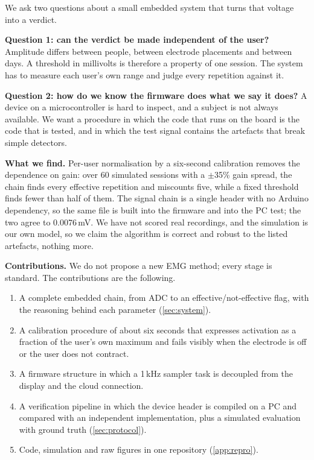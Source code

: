 \documentclass[11pt,letterpaper]{article}
\begin{document}
We ask two questions about a small embedded system that turns that voltage into a verdict.

\textbf{Question 1: can the verdict be made independent of the user?} Amplitude differs between people, between electrode placements and between days. A threshold in millivolts is therefore a property of one session. The system has to measure each user's own range and judge every repetition against it.

\textbf{Question 2: how do we know the firmware does what we say it does?} A device on a microcontroller is hard to inspect, and a subject is not always available. We want a procedure in which the code that runs on the board is the code that is tested, and in which the test signal contains the artefacts that break simple detectors.

\textbf{What we find.} Per-user normalisation by a six-second calibration removes the dependence on gain: over 60 simulated sessions with a $\pm$35\% gain spread, the chain finds every effective repetition and miscounts five, while a fixed threshold finds fewer than half of them. The signal chain is a single header with no Arduino dependency, so the same file is built into the firmware and into the PC test; the two agree to 0.0076\,mV. We have not scored real recordings, and the simulation is our own model, so we claim the algorithm is correct and robust to the listed artefacts, nothing more.

\textbf{Contributions.} We do not propose a new EMG method; every stage is standard. The contributions are the following.
\begin{enumerate}
\item A complete embedded chain, from ADC to an effective/not-effective flag, with the reasoning behind each parameter (\cref{sec:system}).
\item A calibration procedure of about six seconds that expresses activation as a fraction of the user's own maximum and fails visibly when the electrode is off or the user does not contract.
\item A firmware structure in which a 1\,kHz sampler task is decoupled from the display and the cloud connection.
\item A verification pipeline in which the device header is compiled on a PC and compared with an independent implementation, plus a simulated evaluation with ground truth (\cref{sec:protocol}).
\item Code, simulation and raw figures in one repository (\cref{app:repro}).
\end{enumerate}
\end{document}
